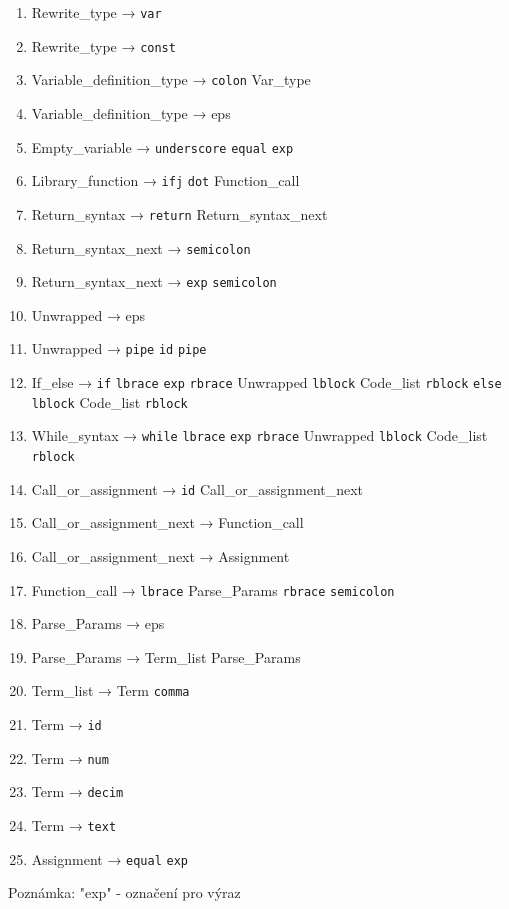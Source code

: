 \documentclass[a4paper, 12pt]{article}
\begin{document}
\begin{enumerate}
    \item Rewrite\_type → \texttt{var}
    \item Rewrite\_type → \texttt{const}
    \item Variable\_definition\_type → \texttt{colon} Var\_type
    \item Variable\_definition\_type → eps
    \item Empty\_variable → \texttt{underscore} \texttt{equal} \texttt{exp}
    \item Library\_function → \texttt{ifj} \texttt{dot} Function\_call
    \item Return\_syntax → \texttt{return} Return\_syntax\_next
    \item Return\_syntax\_next → \texttt{semicolon}
    \item Return\_syntax\_next → \texttt{exp} \texttt{semicolon}
    \item Unwrapped → eps
    \item Unwrapped → \texttt{pipe} \texttt{id} \texttt{pipe}
    \item If\_else → \texttt{if} \texttt{lbrace} \texttt{exp} \texttt{rbrace} Unwrapped \texttt{lblock} Code\_list \texttt{rblock} \texttt{else} \texttt{lblock} Code\_list \texttt{rblock}
    \item While\_syntax → \texttt{while} \texttt{lbrace} \texttt{exp} \texttt{rbrace} Unwrapped \texttt{lblock} Code\_list \texttt{rblock}
    \item Call\_or\_assignment → \texttt{id} Call\_or\_assignment\_next
    \item Call\_or\_assignment\_next → Function\_call
    \item Call\_or\_assignment\_next → Assignment
    \item Function\_call → \texttt{lbrace} Parse\_Params \texttt{rbrace} \texttt{semicolon}
    \item Parse\_Params → eps
    \item Parse\_Params → Term\_list Parse\_Params
    \item Term\_list → Term \texttt{comma}
    \item Term → \texttt{id}
    \item Term → \texttt{num}
    \item Term → \texttt{decim}
    \item Term → \texttt{text}
    \item Assignment → \texttt{equal} \texttt{exp}
\end{enumerate}

\vspace{1cm}
Poznámka: "exp" - označení pro výraz
\end{document}
